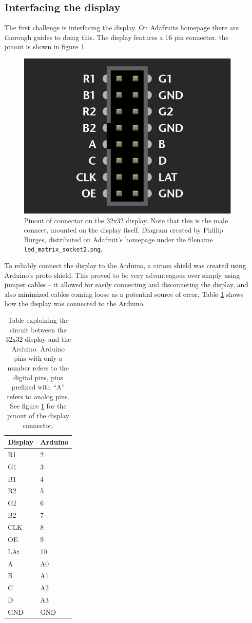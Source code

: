 \documentclass{article}
\begin{document}
\subsection{Interfacing the display}
The first challenge is interfacing the display.
On Adafruits homepage there are thorough guides to doing this.
The display features a 16 pin connector, the pinout is shown in figure \ref{fig:pinout}.
\begin{figure}[h]
  \centering
  \includegraphics[width=.75\textwidth]{media/pinout}
  \cprotect\caption{Pinout of connector on the 32x32 display. Note that this is the male connect, mounted on the display itself. Diagram created by Phillip Burges, distributed on Adafruit's homepage under the filename \verb|led_matrix_socket2.png|.}
  \label{fig:pinout}
\end{figure}

To reliably connect the display to the Arduino, a cutom shield was created using Arduino's proto shield.
This proved to be very advanteagous over simply using jumper cables -- it allowed for easily connecting and disconneting the display, and also minimized cables coming loose as a potential source of error.
Table \ref{tab:pinout} shows how the display was connected to the Arduino.

\begin{table}[h]
  \centering
  \begin{tabular}{ll}
    Display& Arduino\\\hline
    R1& 2\\
    G1& 3\\
    B1& 4\\
    R2& 5\\
    G2& 6\\
    B2& 7\\
    CLK& 8\\
    OE& 9\\
    LAt& 10\\
    A& A0\\
    B& A1\\
    C& A2\\
    D& A3\\
    GND& GND
  \end{tabular}
  \caption{Table explaining the circuit between the 32x32 display and the Arduino. Arduino pins with only a number refers to the digital pins, pins prefixed with ``A'' refers to analog pins. See figure \ref{fig:pinout} for the pinout of the display connector.}
  \label{tab:pinout}
\end{table}
\end{document}
